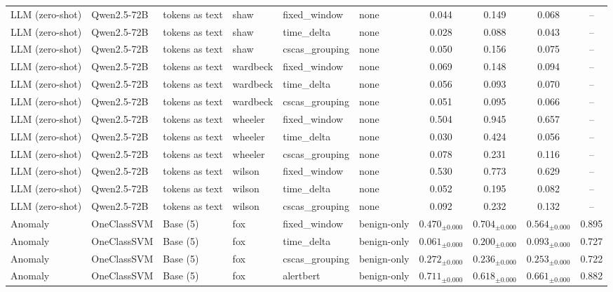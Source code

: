 \begin{longtable}{llllllcccc}
\addlinespace
LLM (zero-shot) & Qwen2.5-72B & tokens as text & shaw & fixed\_window & none & 0.044 & 0.149 & 0.068 & -- \\
\addlinespace
LLM (zero-shot) & Qwen2.5-72B & tokens as text & shaw & time\_delta & none & 0.028 & 0.088 & 0.043 & -- \\
\addlinespace
LLM (zero-shot) & Qwen2.5-72B & tokens as text & shaw & cscas\_grouping & none & 0.050 & 0.156 & 0.075 & -- \\
\addlinespace
LLM (zero-shot) & Qwen2.5-72B & tokens as text & wardbeck & fixed\_window & none & 0.069 & 0.148 & 0.094 & -- \\
\addlinespace
LLM (zero-shot) & Qwen2.5-72B & tokens as text & wardbeck & time\_delta & none & 0.056 & 0.093 & 0.070 & -- \\
\addlinespace
LLM (zero-shot) & Qwen2.5-72B & tokens as text & wardbeck & cscas\_grouping & none & 0.051 & 0.095 & 0.066 & -- \\
\addlinespace
LLM (zero-shot) & Qwen2.5-72B & tokens as text & wheeler & fixed\_window & none & 0.504 & 0.945 & 0.657 & -- \\
\addlinespace
LLM (zero-shot) & Qwen2.5-72B & tokens as text & wheeler & time\_delta & none & 0.030 & 0.424 & 0.056 & -- \\
\addlinespace
LLM (zero-shot) & Qwen2.5-72B & tokens as text & wheeler & cscas\_grouping & none & 0.078 & 0.231 & 0.116 & -- \\
\addlinespace
LLM (zero-shot) & Qwen2.5-72B & tokens as text & wilson & fixed\_window & none & 0.530 & 0.773 & 0.629 & -- \\
\addlinespace
LLM (zero-shot) & Qwen2.5-72B & tokens as text & wilson & time\_delta & none & 0.052 & 0.195 & 0.082 & -- \\
\addlinespace
LLM (zero-shot) & Qwen2.5-72B & tokens as text & wilson & cscas\_grouping & none & 0.092 & 0.232 & 0.132 & -- \\
\midrule
Anomaly & OneClassSVM & Base (5) & fox & fixed\_window & benign-only & $0.470_{\pm 0.000}$ & $0.704_{\pm 0.000}$ & $0.564_{\pm 0.000}$ & 0.895 \\
\addlinespace
Anomaly & OneClassSVM & Base (5) & fox & time\_delta & benign-only & $0.061_{\pm 0.000}$ & $0.200_{\pm 0.000}$ & $0.093_{\pm 0.000}$ & 0.727 \\
\addlinespace
Anomaly & OneClassSVM & Base (5) & fox & cscas\_grouping & benign-only & $0.272_{\pm 0.000}$ & $0.236_{\pm 0.000}$ & $0.253_{\pm 0.000}$ & 0.722 \\
\addlinespace
Anomaly & OneClassSVM & Base (5) & fox & alertbert & benign-only & $0.711_{\pm 0.000}$ & $0.618_{\pm 0.000}$ & $0.661_{\pm 0.000}$ & 0.882 \\

\end{longtable}
